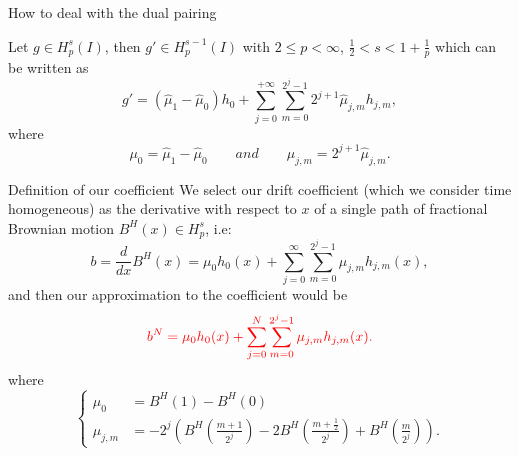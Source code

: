 \documentclass{beamer}
\begin{document}
\begin{frame}{How to deal with the dual pairing}
        \begin{theorem}
                Let
                $g \in H^{s}_{p}(I)$,
                then
                $g' \in H^{s-1}_{p}(I)$
                with
                $2 \leq p < \infty$,
                $\frac{1}{2} < s < 1 + \frac{1}{p}$
                which can be written as
                \begin{equation*}
                        g' = (\hat{\mu}_1 - \hat{\mu}_0)h_0 + \sum_{j=0}^{+\infty} \sum_{m=0}^{2^{j} - 1} 2^{j+1} \hat{\mu}_{j,m} h_{j,m},
                \end{equation*}
                where
                \begin{equation*}
                        \mu_{0} = \hat{\mu}_1 - \hat{\mu}_0 \qquad and \qquad \mu_{j,m} = 2^{j+1} \hat{\mu}_{j,m}.
                \end{equation*}
        \end{theorem}
\end{frame}

\begin{frame}{Definition of our coefficient}
        \small
        We select our drift coefficient (which we consider time homogeneous) as the derivative with respect to
        $ x $
        of a single path of fractional Brownian motion
        $ B^{H}(x) \in H^{s}_{p} $,
        i.e:
        \begin{equation*}
                b = \frac{d}{dx}B^{H}(x) = \mu_{0} h_{0}(x) + \sum_{j=0}^{\infty} \sum_{m=0}^{2^{j} - 1} \mu_{j,m} h_{j,m}(x),
        \end{equation*}
        \pause
        and then our approximation to the coefficient would be
        \begin{equation*}
                \color{red}
                b^{N} = \mu_{0} h_{0}(x) + \sum_{j=0}^{N} \sum_{m=0}^{2^{j} - 1} \mu_{j,m} h_{j,m}(x).
        \end{equation*}
        \pause
        where
        \begin{equation*}
        \begin{cases}
                \mu_{0} &= B^{H}(1) - B^{H}(0)
                \\
                \mu_{j,m} &= -2^j \left( B^H \left( \frac{m+1}{2^j} \right) -2B^H \left( \frac{m + \frac{1}{2}}{2^j} \right) + B^H \left( \frac{m}{2^j} \right) \right).
        \end{cases}
        \end{equation*}
\end{frame}
\end{document}
